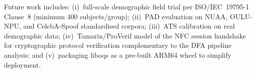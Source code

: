 \documentclass[submission]{sacjsub}
\begin{document}
Future work includes: (i)~full-scale demographic field trial per
ISO/IEC~19795-1 Clause~8 (minimum 400 subjects/group); (ii)~PAD
evaluation on NUAA, OULU-NPU, and CelebA-Spoof standardised corpora;
(iii)~ATS calibration on real demographic data; (iv)~Tamarin/ProVerif
model of the NFC session handshake for cryptographic protocol
verification complementary to the DFA pipeline analysis; and
(v)~packaging liboqs as a pre-built ARM64 wheel to simplify deployment.



\end{document}
